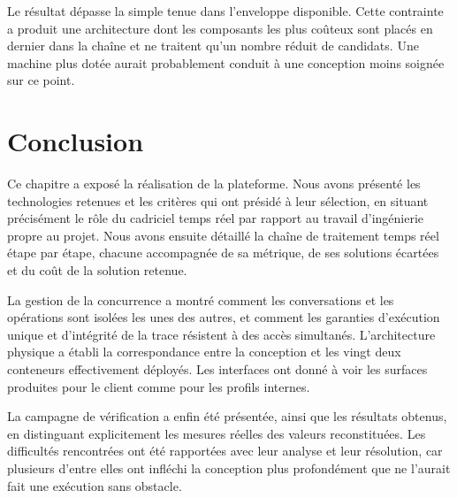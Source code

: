 Le résultat dépasse la simple tenue dans l'enveloppe disponible. Cette contrainte a produit une architecture dont les composants les plus coûteux sont placés en dernier dans la chaîne et ne traitent qu'un nombre réduit de candidats. Une machine plus dotée aurait probablement conduit à une conception moins soignée sur ce point.

\section*{Conclusion}

Ce chapitre a exposé la réalisation de la plateforme. Nous avons présenté les technologies retenues et les critères qui ont présidé à leur sélection, en situant précisément le rôle du cadriciel temps réel par rapport au travail d'ingénierie propre au projet. Nous avons ensuite détaillé la chaîne de traitement temps réel étape par étape, chacune accompagnée de sa métrique, de ses solutions écartées et du coût de la solution retenue.

La gestion de la concurrence a montré comment les conversations et les opérations sont isolées les unes des autres, et comment les garanties d'exécution unique et d'intégrité de la trace résistent à des accès simultanés. L'architecture physique a établi la correspondance entre la conception et les vingt deux conteneurs effectivement déployés. Les interfaces ont donné à voir les surfaces produites pour le client comme pour les profils internes.

La campagne de vérification a enfin été présentée, ainsi que les résultats obtenus, en distinguant explicitement les mesures réelles des valeurs reconstituées. Les difficultés rencontrées ont été rapportées avec leur analyse et leur résolution, car plusieurs d'entre elles ont infléchi la conception plus profondément que ne l'aurait fait une exécution sans obstacle.

